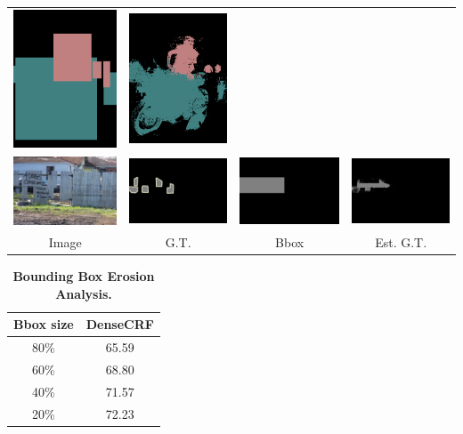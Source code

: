 \begin{table}
\begin{tabular}{c c c c}
    \includegraphics[width=0.21\linewidth]{fig/erode_bbox/bbox/2009_002382.png} & 
    \includegraphics[width=0.21\linewidth]{fig/erode_bbox/crf/2009_002382.png} \\    
    \includegraphics[width=0.21\linewidth]{fig/erode_bbox/img/2008_004339.jpg} & 
    \includegraphics[width=0.21\linewidth]{fig/erode_bbox/gt/2008_004339.png} & 
    \includegraphics[width=0.21\linewidth]{fig/erode_bbox/bbox/2008_004339.png} & 
    \includegraphics[width=0.21\linewidth]{fig/erode_bbox/crf/2008_004339.png} \\    
    Image & G.T. & Bbox & Est. G.T.
  \end{tabular}
\end{table}


\begin{table}
  \centering
  \caption{{\bf{Bounding Box Erosion Analysis.}}}
  \begin{tabular}{c | c}
    Bbox size & DenseCRF  \\
    \hline
    \hline
    80\%  & 65.59 \\
    60\%  & 68.80 \\
    40\%  & 71.57 \\
    20\%  & 72.23 \\
    \end{tabular}
  \label{tb:bbox_erosion}
\end{table}

